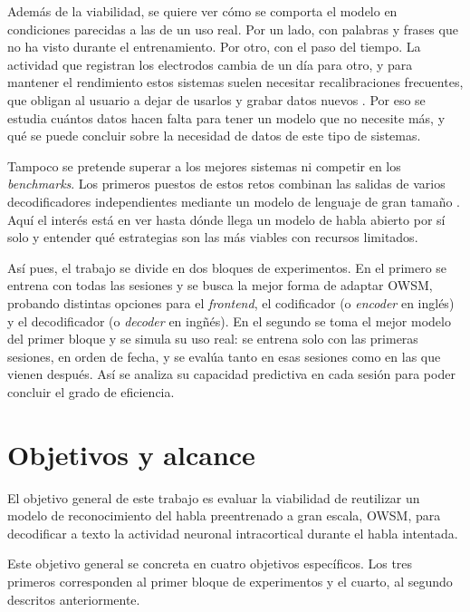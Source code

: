 Además de la viabilidad, se quiere ver cómo se comporta el modelo en condiciones parecidas a las de un uso real. Por un lado, con palabras y frases que no ha visto durante el entrenamiento. Por otro, con el paso del tiempo. La actividad que registran los electrodos cambia de un día para otro, y para mantener el rendimiento estos sistemas suelen necesitar recalibraciones frecuentes, que obligan al usuario a dejar de usarlos y grabar datos nuevos \cite{fan2023corp}. Por eso se estudia cuántos datos hacen falta para tener un modelo que no necesite más, y qué se puede concluir sobre la necesidad de datos de este tipo de sistemas.

Tampoco se pretende superar a los mejores sistemas ni competir en los \textit{benchmarks}. Los primeros puestos de estos retos combinan las salidas de varios decodificadores independientes mediante un modelo de lenguaje de gran tamaño \cite{b2t24lessons}. Aquí el interés está en ver hasta dónde llega un modelo de habla abierto por sí solo y entender qué estrategias son las más viables con recursos limitados.

Así pues, el trabajo se divide en dos bloques de experimentos. En el primero se entrena con todas las sesiones y se busca la mejor forma de adaptar OWSM, probando distintas opciones para el \textit{frontend}, el codificador (o \textit{encoder} en inglés) y el decodificador (o \textit{decoder} en ingñés). En el segundo se toma el mejor modelo del primer bloque y se simula su uso real: se entrena solo con las primeras sesiones, en orden de fecha, y se evalúa tanto en esas sesiones como en las que vienen después. Así se analiza su capacidad predictiva en cada sesión para poder concluir el grado de eficiencia.

\section{Objetivos y alcance}
\label{sec:objetivos}


El objetivo general de este trabajo es evaluar la viabilidad de reutilizar un modelo de reconocimiento del habla preentrenado a gran escala, OWSM, para decodificar a texto la actividad neuronal intracortical durante el habla intentada.


Este objetivo general se concreta en cuatro objetivos específicos. Los tres primeros corresponden al primer bloque de experimentos y el cuarto, al segundo descritos anteriormente. 

